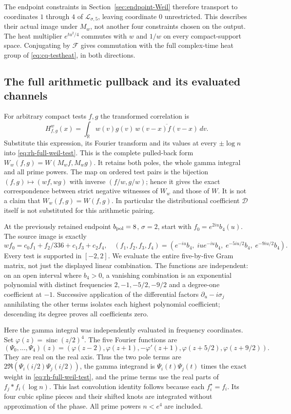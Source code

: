 The endpoint constraints in Section~\ref{sec:endpoint-Weil} therefore
transport to coordinates $1$ through $4$ of $\mathcal L_{\sigma,5}$,
leaving coordinate $0$ unrestricted. This describes their actual image
under $M_w$, not another four constraints chosen on the output.
The heat multiplier $e^{tu^2/4}$ commutes with $w$ and $1/w$ on
every compact-support space. Conjugating by $\mathscr F$ gives
commutation with the full complex-time heat group of
\eqref{eq:cq-testheat}, in both directions.

\subsection{The full arithmetic pullback and its evaluated channels}

For arbitrary compact tests $f,g$ the transformed correlation is
\begin{equation}
 H^w_{f,g}(x)=\int_{\mathbb R}
       w(v)g(v)\,\overline{w(v-x)f(v-x)}\,dv.
 \label{eq:xw-correlation}
\end{equation}
Substitute this expression, its Fourier transform and its values at
every $\pm\log n$ into \eqref{eq:rh-full-weil-test}. This is the
complete pulled-back form $W_w(f,g)=W(M_wf,M_wg)$.
It retains both poles, the whole gamma integral and all prime powers.
The map on ordered test pairs is the bijection
$(f,g)\mapsto(wf,wg)$ with inverse $(f/w,g/w)$; hence it gives the
exact correspondence between strict negative witnesses of $W_w$
and those of $W$. It is not a claim that $W_w(f,g)=W(f,g)$.
In particular the distributional coefficient $\mathcal D$ itself
is not substituted for this arithmetic pairing.

At the previously retained endpoint $b_{\rm pol}=8$, $\sigma=2$,
start with $f_0=e^{2iu}b_4(u)$. The source image is exactly
\[
 wf_0=c_0f_1+f_2/336+c_1f_3+c_2f_4,\quad
 (f_1,f_2,f_3,f_4)
  =(e^{-iu}b_4,\;iu e^{-iu}b_4,\;
                     e^{-5iu/2}b_4,\;e^{-9iu/2}b_4).
\]
Every test is supported in $[-2,2]$. We evaluate the entire
five-by-five Gram matrix, not just the displayed linear combination.
The functions are independent: on an open interval where $b_4>0$,
a vanishing combination is an exponential polynomial with distinct
frequencies $2,-1,-5/2,-9/2$ and a degree-one coefficient at $-1$.
Successive application of the differential factors
$\partial_u-i\sigma_j$ annihilating the other terms isolates each
highest polynomial coefficient; descending its degree proves
all coefficients zero.

Here the gamma integral was independently evaluated in frequency
coordinates. Set $\varphi(z)=\operatorname{sinc}(z/2)^4$.
The five Fourier functions are
\[
 (\Psi_0,\ldots,\Psi_4)(z)
   =(\varphi(z-2),\varphi(z+1),-\varphi'(z+1),
                        \varphi(z+5/2),\varphi(z+9/2)).
\]
They are real on the real axis. Thus the two pole terms are
$2\Re(\Psi_i(i/2)\Psi_j(i/2))$, the gamma integrand is
$\Psi_i(t)\Psi_j(t)$ times the exact weight in
\eqref{eq:rh-full-weil-test}, and the prime terms use the real
parts of $f_j*f_i(\log n)$. This last convolution identity follows
because each $f_i^\star=f_i$. Its four cubic spline pieces and their
shifted knots are integrated without approximation of the phase.
All prime powers $n<e^4$ are included.

